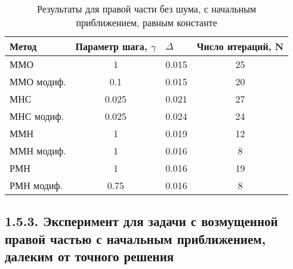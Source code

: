 \begin{table}[H]
	\centering
	\caption{Результаты для правой части без шума, с начальным приближением, равным константе}
	\label{table1.2}
	\begin{tabular}{|l|c|c|c|}
		\hline
		\textbf{Метод}                   & \multicolumn{1}{l|}{\textbf{Параметр шага, $\gamma$}} & \multicolumn{1}{l|}{\textbf{$\Delta$}} & \multicolumn{1}{l|}{\textbf{Число итераций, N}} \\ \hline
		ММО                              & 1                                                     & 0.015                                  & 25                                              \\ \hline
		\multicolumn{1}{|r|}{ММО модиф.} & 0.1                                                   & 0.015                                  & 20                                              \\ \hline
		МНС                              & 0.025                                                 & 0.021                                  & 27                                              \\ \hline
		МНС модиф.                       & 0.025                                                 & 0.024                                  & 24                                              \\ \hline
		ММН                              & 1                                                     & 0.019                                  & 12                                              \\ \hline
		ММН модиф.                       & 1                                                     & 0.016                                  & 8                                               \\ \hline
		РМН                              & 1                                                     & 0.016                                  & 19                                              \\ \hline
		РМН модиф.                       & 0.75                                                  & 0.016                                  & 8                                               \\ \hline
	\end{tabular}
\end{table}

\subsection*{1.5.3. Эксперимент для задачи с возмущенной правой частью с начальным приближением, далеким от точного решения} 


